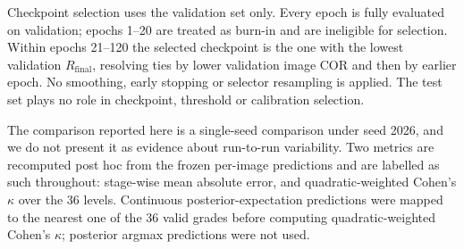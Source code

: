Checkpoint selection uses the validation set only. Every epoch is fully
evaluated on validation; epochs 1--20 are treated as burn-in and are ineligible
for selection. Within epochs 21--120 the selected checkpoint is the one with the
lowest validation $R_{\mathrm{final}}$, resolving ties by lower validation image
COR and then by earlier epoch. No smoothing, early stopping or selector
resampling is applied. The test set plays no role in checkpoint, threshold or
calibration selection.

The comparison reported here is a single-seed comparison under seed 2026, and we
do not present it as evidence about run-to-run variability. Two metrics are
recomputed post hoc from the frozen per-image predictions and are labelled as
such throughout: stage-wise mean absolute error, and quadratic-weighted Cohen's
$\kappa$ over the 36 levels. Continuous posterior-expectation predictions were
mapped to the nearest one of the 36 valid grades before computing
quadratic-weighted Cohen's $\kappa$; posterior argmax predictions were not used.
